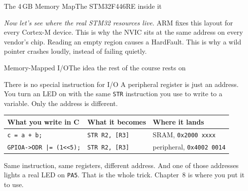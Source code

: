 \documentclass[9pt,aspectratio=169,xcolor=table]{beamer}
\newcommand{\striped}{\rowcolors{1}{white}{stripe}}
\begin{document}
\begin{frame}[plain]{The 4\,GB Memory Map}{The STM32F446RE inside it}
\begin{center}
	\end{center}
	\vspace{1mm}
	{\small\centering \emph{Now let's see where the real STM32 resources live.} ARM \alert{fixes} this layout for every Cortex-M device. This is why the NVIC sits at the same address on every vendor's chip. Reading an empty region causes a \alert{HardFault}. This is why a wild pointer crashes loudly, instead of failing quietly.\par}
\end{frame}
\begin{frame}{Memory-Mapped I/O}{The idea the rest of the course rests on}
    \begin{block}{There is no special instruction for I/O}
        A peripheral register is just an address. You turn an LED on with the same \texttt{STR} instruction you use to write to a variable. Only the address is different.
    \end{block}
    \vspace{3mm}
    \begin{center}
    \striped
    \begin{tabular}{lll}
        \toprule
        \textbf{What you write in C} & \textbf{What it becomes} & \textbf{Where it lands} \\
        \midrule
        \texttt{c = a + b;}              & \texttt{STR R2, [R3]} & SRAM, \texttt{0x2000\,xxxx} \\
        \texttt{GPIOA->ODR |= (1<<5);}   & \texttt{STR R2, [R3]} & \alert{peripheral}, \texttt{0x4002\,0014} \\
        \bottomrule
    \end{tabular}
    \end{center}
    \vspace{3mm}
    {\small Same instruction, same registers, different address. And one of those addresses lights a real LED on \texttt{PA5}. That is the whole trick. Chapter~8 is where you put it to use.}
\end{frame}
\end{document}
